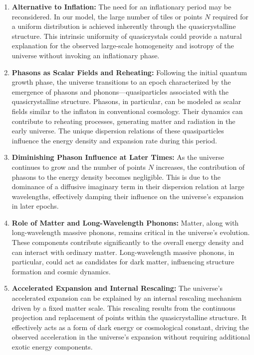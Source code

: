 \documentclass[sn-mathphys-num]{sn-jnl}%
\begin{document}
\begin{enumerate} \item \textbf{Alternative to Inflation:} The need for an inflationary period may be reconsidered. In our model, the large number of tiles or points $N$ required for a uniform distribution is achieved inherently through the quasicrystalline structure. This intrinsic uniformity of quasicrystals could provide a natural explanation for the observed large-scale homogeneity and isotropy of the universe without invoking an inflationary phase.

\item \textbf{Phasons as Scalar Fields and Reheating:} Following the initial quantum growth phase, the universe transitions to an epoch characterized by the emergence of phasons and phonons—quasiparticles associated with the quasicrystalline structure. Phasons, in particular, can be modeled as scalar fields similar to the inflaton in conventional cosmology. Their dynamics can contribute to reheating processes, generating matter and radiation in the early universe. The unique dispersion relations of these quasiparticles influence the energy density and expansion rate during this period.

\item \textbf{Diminishing Phason Influence at Later Times:} As the universe continues to grow and the number of points \( N \) increases, the contribution of phasons to the energy density becomes negligible. This is due to the dominance of a diffusive imaginary term in their dispersion relation at large wavelengths, effectively damping their influence on the universe's expansion in later epochs.

\item \textbf{Role of Matter and Long-Wavelength Phonons:} Matter, along with long-wavelength massive phonons, remains critical in the universe's evolution. These components contribute significantly to the overall energy density and can interact with ordinary matter. Long-wavelength massive phonons, in particular, could act as candidates for dark matter, influencing structure formation and cosmic dynamics.

\item \textbf{Accelerated Expansion and Internal Rescaling:} The universe's accelerated expansion can be explained by an internal rescaling mechanism driven by a fixed matter scale. This rescaling results from the continuous projection and replacement of points within the quasicrystalline structure. It effectively acts as a form of dark energy or cosmological constant, driving the observed acceleration in the universe's expansion without requiring additional exotic energy components.


\end{enumerate}
\end{document}
